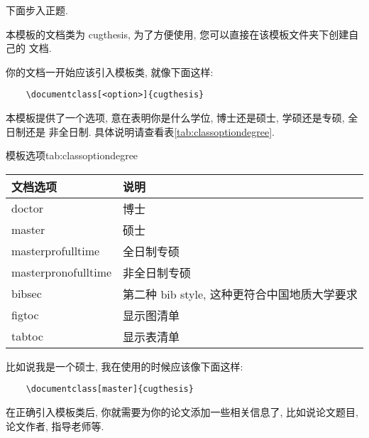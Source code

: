 \documentclass[bibsec, doctor, tabtoc]{cugthesis}
\begin{document}
下面步入正题.

本模板的文档类为 cugthesis, 为了方便使用, 您可以直接在该模板文件夹下创建自己的
文档.

你的文档一开始应该引入模板类, 就像下面这样:
\begin{verbatim}
    \documentclass[<option>]{cugthesis}
\end{verbatim}

本模板提供了一个选项, 意在表明你是什么学位, 博士还是硕士, 学硕还是专硕, 全日制还是
非全日制. 具体说明请查看表\ref{tab:classoptiondegree}.

\begin{ttab}{模板选项}{tab:classoptiondegree}
    \begin{tabular}{ll}
        \toprule
        文档选项            & 说明                                         \\
        \midrule
        doctor              & 博士                                         \\
        master              & 硕士                                         \\
        masterprofulltime   & 全日制专硕                                   \\
        masterpronofulltime & 非全日制专硕                                 \\
        bibsec              & 第二种 bib style, 这种更符合中国地质大学要求 \\
        figtoc              & 显示图清单                                   \\
        tabtoc              & 显示表清单                                   \\
        \bottomrule
    \end{tabular}
\end{ttab}

比如说我是一个硕士, 我在使用的时候应该像下面这样:
\begin{verbatim}
    \documentclass[master]{cugthesis}
\end{verbatim}

在正确引入模板类后, 你就需要为你的论文添加一些相关信息了, 比如说论文题目, 论文作者,
指导老师等.
\end{document}
